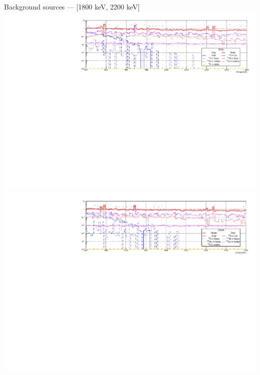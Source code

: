 \documentclass[10pt]{beamer}
\begin{document}
\begin{frame}{Background sources --- [1800 keV, 2200 keV]}
	\centering\includegraphics[height=\textwidth, angle=270]{img/bkgBEGeroi.pdf} \\
	\centering\includegraphics[height=\textwidth, angle=270]{img/bkgCOAXroi.pdf}
\end{frame}
\end{document}
